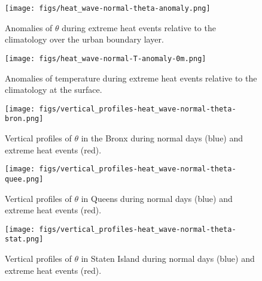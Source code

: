 \documentclass[11pt,a4paper]{article}
\begin{document}
\begin{figure}[ht]
	\centering
	\texttt{[image: figs/heat\_wave-normal-theta-anomaly.png]}
	\caption{Anomalies of $\theta$ during extreme heat events relative to the climatology over the urban boundary layer.}
	\label{fig:extreme-heat-normal-comparison-contours-theta}
\end{figure}
\begin{figure}[ht]
	\centering
	\texttt{[image: figs/heat\_wave-normal-T-anomaly-0m.png]}
	\caption{Anomalies of temperature during extreme heat events relative to the climatology at the surface.}
	\label{fig:extreme_heat_normal_0m_comparison_T}
\end{figure}
\begin{figure}[ht]
	\centering
	\texttt{[image: figs/vertical\_profiles-heat\_wave-normal-theta-bron.png]}
	\caption{Vertical profiles of $\theta$ in the Bronx during normal days (blue) and extreme heat events (red).}
	\label{fig:vertical_profiles-heat_wave-normal-theta-bron}
\end{figure}
\begin{figure}[ht]
	\centering
	\texttt{[image: figs/vertical\_profiles-heat\_wave-normal-theta-quee.png]}
	\caption{Vertical profiles of $\theta$ in Queens during normal days (blue) and extreme heat events (red).}
	\label{fig:vertical_profiles-heat_wave-normal-theta-quee}
\end{figure}
\begin{figure}[ht]
	\centering
	\texttt{[image: figs/vertical\_profiles-heat\_wave-normal-theta-stat.png]}
	\caption{Vertical profiles of $\theta$ in Staten Island during normal days (blue) and extreme heat events (red).}
	\label{fig:vertical_profiles-heat_wave-normal-theta-stat}
\end{figure}
\end{document}
